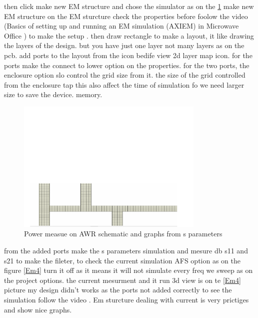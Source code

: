 \documentclass{article}
\begin{document}
\begin{itemize}
then click make new EM structure and chose the simulator as on the \cref{Em3} make new EM structure 
on the EM sturcture check the properties before foolow the video (Basics of setting up and running an EM simulation (AXIEM) in Microwave Office
) to make the setup . then draw rectangle to make a layout, it like drawing the layers of the design. but you have just one layer not many layers as on the pcb.
add ports to the layout  from the icon bedife view 2d layer map icon. 
for the ports make the connect to lower option on the properties. for the two ports, 
the enclosure option slo control the grid size from it. 
the size of the grid controlled from the enclosure tap this also affect the time of simulation fo we need larger size to save the device. memory. 
\begin{figure}[H]
    \centering
    \includegraphics[width=0.8\textwidth]{figures/Em3.pdf}
    \caption{Power measue on AWR schematic and graphs from s parameters}
    \label{Em3}
\end{figure}


from the added ports make the s parameters simulation and mesure db s11 and s21 to make the fileter, 
to check the  current simulation  AFS option as on the figure \cref{Em4} turn it off as it means it will not  simulate every freq we sweep as on the project options.
the current mesurment and it run 3d view is on  te \cref{Em4}  picture my design didn't works as the ports not added correctly to see the simulation follow the video . 
Em sturcture dealing with current is very prictiges and show nice graphs.



\end{itemize}
\end{document}
